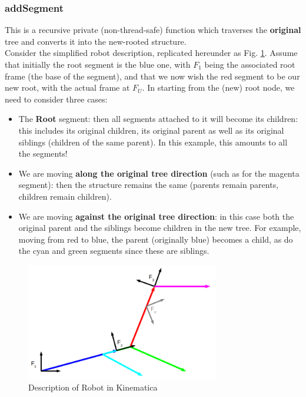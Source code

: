 \documentclass[12pt,a4paper,onecolumn]{article}
\begin{document}
\subsubsection*{addSegment}
This is a recursive private (non-thread-safe) function which traverses the \textbf{original} tree and converts it into the new-rooted structure.\\
\newline
\noindent Consider the simplified robot description, replicated hereunder as Fig. \ref{FIG_ROBOT_TREE_DEFINITION_2}. Assume that initially the root segment is the blue one, with $F_1$ being the associated root frame (the base of the segment), and that we now wish the red segment to be our new root, with the actual frame at $F_U$. In starting from the (new) root node, we  need to consider three cases:
\begin{itemize}
\item The \textbf{Root} segment: then all segments attached to it will become its children: this includes its original children, its original parent as well as its original siblings (children of the same parent). In this example, this amounts to all the segments!
\item We are moving \textbf{along the original tree direction} (such as for the magenta segment): then the structure remains the same (parents remain parents, children remain children).
\item We are moving \textbf{against the original tree direction}: in this case both the original parent and the siblings become children in the new tree. For example, moving from red to blue, the parent (originally blue) becomes a child, as do the cyan and green segments since these are siblings.
\end{itemize}

\begin{figure}[!htp]
	\centering
    \includegraphics[width=0.75\textwidth]{Robot_Tree.png}
    \caption{Description of Robot in Kinematica}
   	\label{FIG_ROBOT_TREE_DEFINITION_2}
\end{figure}
\end{document}
